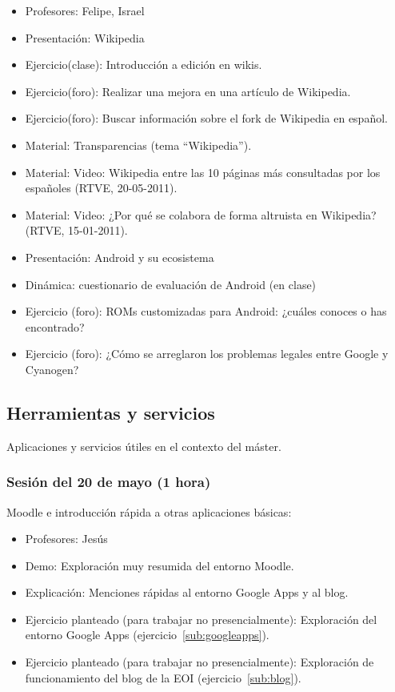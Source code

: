 \documentclass[a4paper,12pt]{article}
\begin{document}
\begin{itemize}
\item Profesores: Felipe, Israel
\item Presentación: Wikipedia
\item Ejercicio(clase): Introducción a edición en wikis.
\item Ejercicio(foro): Realizar una mejora en una artículo de Wikipedia.
\item Ejercicio(foro): Buscar información sobre el fork de Wikipedia en español.
\item Material: Transparencias (tema ``Wikipedia'').
\item Material: Video: Wikipedia entre las 10 páginas más consultadas por los españoles (RTVE, 20-05-2011).
\item Material: Video: ¿Por qué se colabora de forma altruista en Wikipedia? (RTVE, 15-01-2011).
\item Presentación: Android y su ecosistema
\item Dinámica: cuestionario de evaluación de Android (en clase)
\item Ejercicio (foro): ROMs customizadas para Android: ¿cuáles
  conoces o has encontrado?
\item Ejercicio (foro): ¿Cómo se arreglaron los problemas legales
  entre Google y Cyanogen?
\end{itemize}

\subsection{Herramientas y servicios}

Aplicaciones y servicios útiles en el contexto del máster.

\subsubsection{Sesión del 20 de mayo (1 hora)}

Moodle e introducción rápida a otras aplicaciones básicas:

\begin{itemize}
\item Profesores: Jesús
\item Demo: Exploración muy resumida del entorno Moodle.
\item Explicación: Menciones rápidas al entorno Google Apps y al blog.
\item Ejercicio planteado (para trabajar no presencialmente): Exploración del entorno Google Apps (ejercicio~\ref{sub:googleapps}).
\item Ejercicio planteado (para trabajar no presencialmente): Exploración de funcionamiento del blog de la EOI (ejercicio~\ref{sub:blog}).
\end{itemize}
\end{document}
